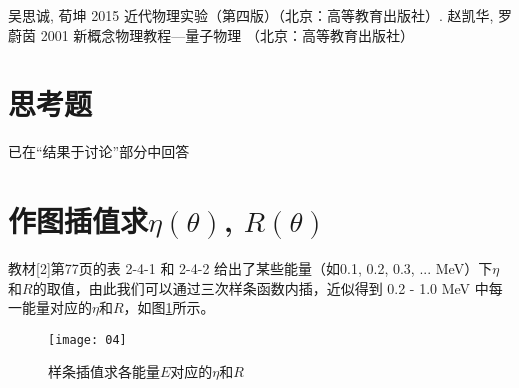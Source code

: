 \documentclass[aps,pre,12pt,preprint,onecolumn,showpacs,showkeys]{revtex4-1}
\begin{document}
\begin{thebibliography}{}
 吴思诚, 荀坤 2015 近代物理实验（第四版）（北京：高等教育出版社）.
 赵凯华, 罗蔚茵 2001 新概念物理教程—量子物理 （北京：高等教育出版社）
\end{thebibliography}
\clearpage
\appendix
\section{思考题}
已在“结果于讨论”部分中回答
\section{作图插值求$\eta(\theta)$, $R(\theta)$}\label{sec:interpolate}
教材[2]第77页的表 2-4-1 和 2-4-2 给出了某些能量（如0.1, 0.2, 0.3, ... MeV）下$\eta$和$R$的取值，由此我们可以通过三次样条函数内插，近似得到 0.2 - 1.0 MeV 中每一能量对应的$\eta$和$R$，如图\ref{fig:interpolate}所示。
\begin{figure}[h]
\centering
\texttt{[image: 04]}
\caption{\label{fig:interpolate}%
样条插值求各能量$E$对应的$\eta$和$R$}
\end{figure}
\end{document}

